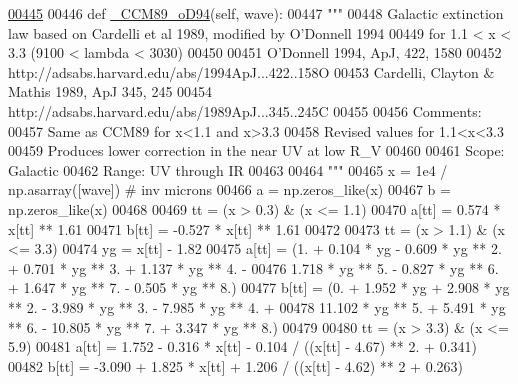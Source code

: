 \begin{DoxyVerb}
\begin{DoxyCode}
\hypertarget{classpyneb_1_1extinction_1_1red__corr_1_1_red_corr_l00445}{}\hyperlink{classpyneb_1_1extinction_1_1red__corr_1_1_red_corr_a8d06942c28efecc3704d5e31c444ca1b}{00445} 
00446     \textcolor{keyword}{def }\hyperlink{classpyneb_1_1extinction_1_1red__corr_1_1_red_corr_a8d06942c28efecc3704d5e31c444ca1b}{\_CCM89\_oD94}(self, wave):
00447         \textcolor{stringliteral}{"""}
00448 \textcolor{stringliteral}{        Galactic extinction law based on Cardelli et al 1989, modified by O'Donnell 1994}
00449 \textcolor{stringliteral}{        for 1.1 < x < 3.3 (9100 < lambda < 3030)}
00450 \textcolor{stringliteral}{        }
00451 \textcolor{stringliteral}{        O'Donnell 1994, ApJ, 422, 1580}
00452 \textcolor{stringliteral}{        http://adsabs.harvard.edu/abs/1994ApJ...422..158O}
00453 \textcolor{stringliteral}{        Cardelli, Clayton & Mathis 1989, ApJ 345, 245}
00454 \textcolor{stringliteral}{        http://adsabs.harvard.edu/abs/1989ApJ...345..245C}
00455 \textcolor{stringliteral}{}
00456 \textcolor{stringliteral}{        Comments:}
00457 \textcolor{stringliteral}{        Same as CCM89 for x<1.1 and x>3.3}
00458 \textcolor{stringliteral}{        Revised values for 1.1<x<3.3}
00459 \textcolor{stringliteral}{        Produces lower correction in the near UV at low R\_V}
00460 \textcolor{stringliteral}{        }
00461 \textcolor{stringliteral}{        Scope: Galactic}
00462 \textcolor{stringliteral}{        Range: UV through IR}
00463 \textcolor{stringliteral}{        }
00464 \textcolor{stringliteral}{        """}
00465         x = 1e4 / np.asarray([wave]) \textcolor{comment}{# inv microns}
00466         a = np.zeros\_like(x)
00467         b = np.zeros\_like(x)
00468         
00469         tt = (x > 0.3) & (x <= 1.1)
00470         a[tt] = 0.574 * x[tt] ** 1.61 
00471         b[tt] = -0.527 * x[tt] ** 1.61
00472     
00473         tt = (x > 1.1) & (x <= 3.3)
00474         yg = x[tt] - 1.82
00475         a[tt] = (1. + 0.104 * yg - 0.609 * yg ** 2. + 0.701 * yg ** 3. + 1.137 * yg ** 4. - 
00476                  1.718 * yg ** 5. - 0.827 * yg ** 6. + 1.647 * yg ** 7. - 0.505 * yg ** 8.)
00477         b[tt] = (0. + 1.952 * yg + 2.908 * yg ** 2. - 3.989 * yg ** 3. - 7.985 * yg ** 4. + 
00478                  11.102 * yg ** 5. + 5.491 * yg ** 6. - 10.805 * yg ** 7. + 3.347 * yg ** 8.)
00479         
00480         tt = (x > 3.3) & (x <= 5.9)
00481         a[tt] = 1.752 - 0.316 * x[tt] - 0.104 / ((x[tt] - 4.67) ** 2. + 0.341)
00482         b[tt] = -3.090 + 1.825 * x[tt] + 1.206 / ((x[tt] - 4.62) ** 2 + 0.263)

\end{DoxyCode}
\end{DoxyVerb}
